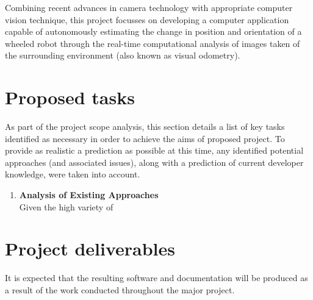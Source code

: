 \documentclass[10pt,fleqn,twoside]{article}
\begin{document}
Combining recent advances in camera technology with appropriate computer vision technique, this project focusses on developing a computer application capable of autonomously estimating the change in position and orientation of a wheeled robot through the real-time computational analysis of images taken of the surrounding environment (also known as visual odometry).


\section{Proposed tasks}

As part of the project scope analysis, this section details a list of key tasks identified as necessary in order to achieve the aims of proposed project. To provide as realistic a prediction as possible at this time, any identified potential approaches (and associated issues), along with a prediction of current developer knowledge, were taken into account.

\begin{enumerate}
	\item \textbf{Analysis of Existing Approaches} \\ \indent Given the high variety of 
\end{enumerate}


\section{Project deliverables}

It is expected that the resulting software and documentation will be produced as a result of the work conducted throughout the major project.


\nocite{*} %


\newpage
{} 

%
%

\renewcommand{\refname}{Annotated Bibliography}  %
\end{document}
